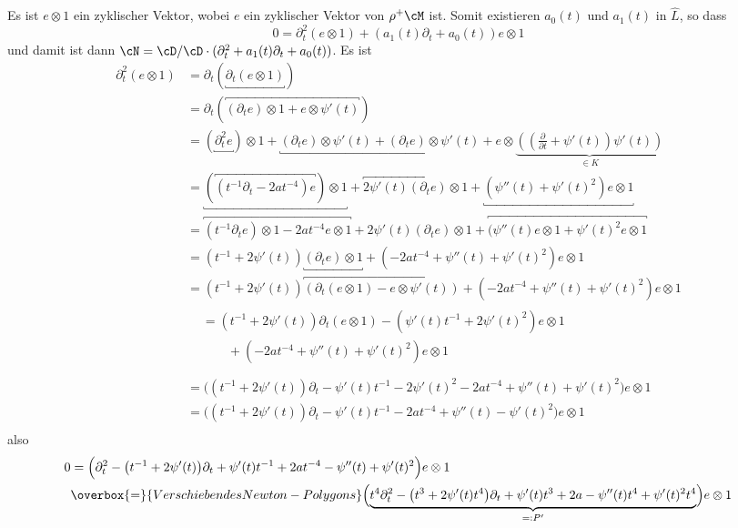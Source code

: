 Es ist $e\otimes 1$ ein zyklischer Vektor, wobei $e$ ein zyklischer Vektor von
$\rho^+\cM$ ist.
Somit existieren $a_0(t)$ und $a_1(t)$ in $\hat L$, so dass
\[
0=\partial_t^2 (e\otimes 1) + (a_1(t)\partial_t + a_0(t)) e\otimes 1
\]
und damit ist dann $\cN=\cD/\cD\cdot(\partial_t^2+a_1(t)\partial_t+a_0(t))$.
Es ist
\begin{align*}
\partial_t^2(e\otimes 1) &=\partial_t(\underbracket{\partial_t(e\otimes 1)})\\
  &= \partial_t(\overbracket{(\partial_te)\otimes 1
    + e\otimes \psi'(t)})\\
  &= (\underbracket{\partial_t^2 e})\otimes 1
    + \underbracket{(\partial_t e)\otimes \psi'(t)
    +               (\partial_t e)\otimes \psi'(t)}
    + e\otimes\underset{\in K}{\underbrace{((\frac{\partial}{\partial t} 
    + \psi'(t))\psi'(t))}}\\
  &= \underbracket{(\overbracket{(t^{-1}\partial_t - 2at^{-4}) e})\otimes 1}
    + \overbracket{2\psi'(t) (\partial_t e)\otimes 1}
    + \underbracket{(\psi''(t) + \psi'(t)^2)e\otimes 1}\\
  &= \overbracket{
      (t^{-1}\partial_t e)\otimes 1
      - 2at^{-4} e\otimes 1
    }
    + 2\psi'(t) (\partial_t e)\otimes 1 + \overbracket{
      ( \psi''(t) e\otimes 1
      + \psi'(t)^2 e\otimes 1
    }\\
  &= (t^{-1} + 2\psi'(t)) \underbracket{(\partial_t e)\otimes 1}
    + (- 2at^{-4} + \psi''(t) + \psi'(t)^2) e\otimes 1 \\
  &= (t^{-1} + 2\psi'(t))\overbracket{(\partial_t (e\otimes 1)
    - e\otimes \psi'(t))}+ (- 2at^{-4} + \psi''(t) + \psi'(t)^2) e\otimes 1 \\
  &\begin{aligned}
    &= (t^{-1} + 2\psi'(t))\partial_t (e\otimes 1)
    - (\psi'(t) t^{-1} + 2\psi'(t)^2)e\otimes 1\\
    &\qquad + (- 2at^{-4} + \psi''(t) + \psi'(t)^2) e\otimes 1 \\
  \end{aligned} \\
  &= \Big((t^{-1} + 2\psi'(t))\partial_t
    - \psi'(t) t^{-1} - 2\psi'(t)^2 - 2at^{-4} + \psi''(t)
    + \psi'(t)^2\Big) e\otimes 1 \\
  &= \Big((t^{-1} + 2\psi'(t))\partial_t
    - \psi'(t) t^{-1} - 2at^{-4} + \psi''(t)
    - \psi'(t)^2\Big) e\otimes 1\\
\end{align*}
also
\begin{align*}
0 &= \Big( \partial_t^2 - \big(t^{-1} + 2\psi'(t)\big)\partial_t
    + \psi'(t) t^{-1} + 2at^{-4} -\psi''(t)
    + \psi'(t)^2\Big) e\otimes 1
\\&\overbox{=}{Verschieben des Newton-Polygons} \Big(\underset{=:P'}{\underbrace{
    t^4\partial_t^2 - \big(t^{3} + 2\psi'(t)t^4\big)\partial_t
    + \psi'(t)t^{3} + 2a -\psi''(t)t^4
    + \psi'(t)^2t^4}}\Big) e\otimes 1
\end{align*}

